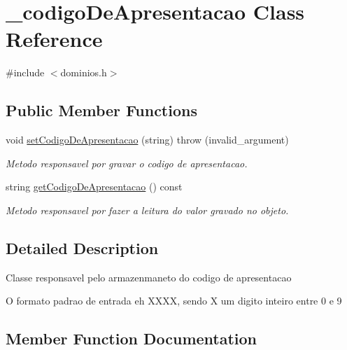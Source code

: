 \hypertarget{class__codigo_de_apresentacao}{}\section{\+\_\+codigo\+De\+Apresentacao Class Reference}
\label{class__codigo_de_apresentacao}


{\ttfamily \#include $<$dominios.\+h$>$}

\subsection*{Public Member Functions}
\begin{DoxyCompactItemize}
\item 
void \mbox{\hyperlink{class__codigo_de_apresentacao_a71d1caf08b03c8ab1247140b47cde6d3}{set\+Codigo\+De\+Apresentacao}} (string)  throw (invalid\+\_\+argument)
\begin{DoxyCompactList}\small\item\em Metodo responsavel por gravar o codigo de apresentacao. \end{DoxyCompactList}\item 
string \mbox{\hyperlink{class__codigo_de_apresentacao_a4fe1c479df168ba3bae339178d302c5a}{get\+Codigo\+De\+Apresentacao}} () const
\begin{DoxyCompactList}\small\item\em Metodo responsavel por fazer a leitura do valor gravado no objeto. \end{DoxyCompactList}\end{DoxyCompactItemize}


\subsection{Detailed Description}
Classe responsavel pelo armazenmaneto do codigo de apresentacao

O formato padrao de entrada eh X\+X\+XX, sendo X um digito inteiro entre 0 e 9 

\subsection{Member Function Documentation}
\mbox{\label{class__codigo_de_apresentacao_a4fe1c479df168ba3bae339178d302c5a}} 
